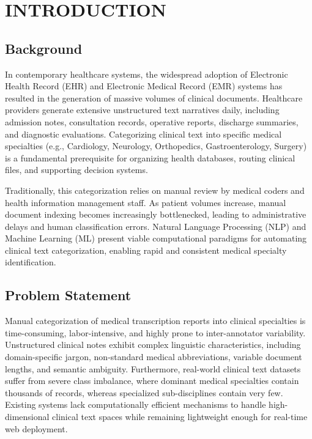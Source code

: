 \section{INTRODUCTION}

\subsection{Background}
In contemporary healthcare systems, the widespread adoption of Electronic Health Record (EHR) and Electronic Medical Record (EMR) systems has resulted in the generation of massive volumes of clinical documents. Healthcare providers generate extensive unstructured text narratives daily, including admission notes, consultation records, operative reports, discharge summaries, and diagnostic evaluations. Categorizing clinical text into specific medical specialties (e.g., Cardiology, Neurology, Orthopedics, Gastroenterology, Surgery) is a fundamental prerequisite for organizing health databases, routing clinical files, and supporting decision systems.

Traditionally, this categorization relies on manual review by medical coders and health information management staff. As patient volumes increase, manual document indexing becomes increasingly bottlenecked, leading to administrative delays and human classification errors. Natural Language Processing (NLP) and Machine Learning (ML) present viable computational paradigms for automating clinical text categorization, enabling rapid and consistent medical specialty identification.

\subsection{Problem Statement}
Manual categorization of medical transcription reports into clinical specialties is time-consuming, labor-intensive, and highly prone to inter-annotator variability. Unstructured clinical notes exhibit complex linguistic characteristics, including domain-specific jargon, non-standard medical abbreviations, variable document lengths, and semantic ambiguity. Furthermore, real-world clinical text datasets suffer from severe class imbalance, where dominant medical specialties contain thousands of records, whereas specialized sub-disciplines contain very few. Existing systems lack computationally efficient mechanisms to handle high-dimensional clinical text spaces while remaining lightweight enough for real-time web deployment.

